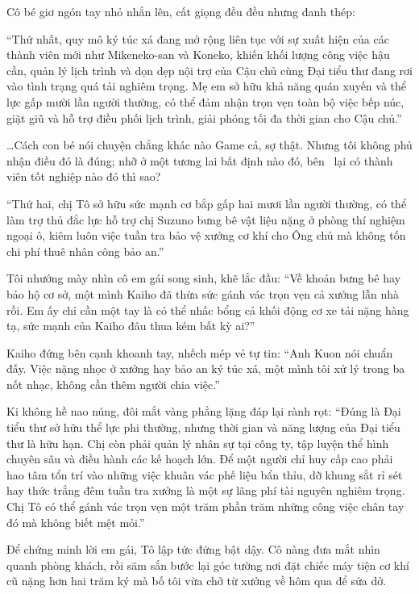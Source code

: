 \documentclass[../main.tex]{subfiles}
\begin{document}
Cô bé giơ ngón tay nhỏ nhắn lên, cất giọng đều đều nhưng đanh thép:

``Thứ nhất, quy mô ký túc xá đang mở rộng liên tục với sự xuất hiện của các thành viên mới như Mikeneko-san và Koneko, khiến khối lượng công việc hậu cần, quản lý lịch trình và dọn dẹp nội trợ của Cậu chủ cùng Đại tiểu thư đang rơi vào tình trạng quá tải nghiêm trọng. Mẹ em sở hữu khả năng quán xuyến và thể lực gấp mười lần người thường, có thể đảm nhận trọn vẹn toàn bộ việc bếp núc, giặt giũ và hỗ trợ điều phối lịch trình, giải phóng tối đa thời gian cho Cậu chủ.''

\dots Cách con bé nói chuyện chẳng khác nào Game cả, sợ thật. Nhưng tôi không phủ nhận điều đó là đúng; nhỡ ở một tương lai bất định nào đó, bên \hll\ lại có thành viên tốt nghiệp nào đó thì sao?

``Thứ hai, chị Tô sở hữu sức mạnh cơ bắp gấp hai mươi lần người thường, có thể làm trợ thủ đắc lực hỗ trợ chị Suzuno bưng bê vật liệu nặng ở phòng thí nghiệm ngoại ô, kiêm luôn việc tuần tra bảo vệ xưởng cơ khí cho Ông chủ mà không tốn chi phí thuê nhân công bảo an.''

Tôi nhướng mày nhìn cô em gái song sinh, khẽ lắc đầu: ``Về khoản bưng bê hay bảo hộ cơ sở, một mình Kaiho đã thừa sức gánh vác trọn vẹn cả xưởng lẫn nhà rồi. Em ấy chỉ cần một tay là có thể nhấc bổng cả khối động cơ xe tải nặng hàng tạ, sức mạnh của Kaiho đâu thua kém bất kỳ ai?''

Kaiho đứng bên cạnh khoanh tay, nhếch mép vẻ tự tin: ``Anh Kuon nói chuẩn đấy. Việc nặng nhọc ở xưởng hay bảo an ký túc xá, một mình tôi xử lý trong ba nốt nhạc, không cần thêm người chia việc.''

Ki không hề nao núng, đôi mắt vàng phẳng lặng đáp lại rành rọt: ``Đúng là Đại tiểu thư sở hữu thể lực phi thường, nhưng thời gian và năng lượng của Đại tiểu thư là hữu hạn. Chị còn phải quản lý nhân sự tại công ty, tập luyện thể hình chuyên sâu và điều hành các kế hoạch lớn. Để một người chỉ huy cấp cao phải hao tâm tổn trí vào những việc khuân vác phế liệu bẩn thỉu, dỡ khung sắt rỉ sét hay thức trắng đêm tuần tra xưởng là một sự lãng phí tài nguyên nghiêm trọng. Chị Tô có thể gánh vác trọn vẹn một trăm phần trăm những công việc chân tay đó mà không biết mệt mỏi.''

Để chứng minh lời em gái, Tô lập tức đứng bật dậy. Cô nàng đưa mắt nhìn quanh phòng khách, rồi săm sắn bước lại góc tường nơi đặt chiếc máy tiện cơ khí cũ nặng hơn hai trăm ký mà bố tôi vừa chở từ xưởng về hôm qua để sửa dở.
\end{document}
